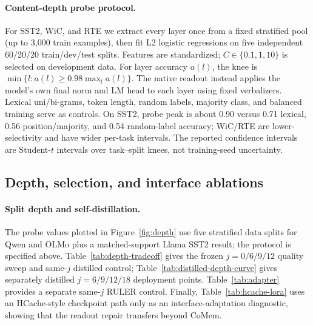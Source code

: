 \paragraph{Content-depth probe protocol.}
For SST2, WiC, and RTE we extract every layer once from a fixed stratified pool
(up to 3,000 train examples), then fit L2 logistic regressions on five independent
60/20/20 train/dev/test splits. Features are standardized; $C\in\{0.1,1,10\}$
is selected on development data. For layer accuracy $a(l)$, the knee is
$\min\{l:a(l)\geq0.98\max_l a(l)\}$. The native readout instead applies the
model's own final norm and LM head to each layer using fixed verbalizers. Lexical
uni/bi-grams, token length, random labels, majority class, and balanced training
serve as controls. On SST2, probe peak is about 0.90 versus 0.71 lexical, 0.56
position/majority, and 0.54 random-label accuracy; WiC/RTE are lower-selectivity
and have wider per-task intervals. The reported confidence intervals are
Student-$t$ intervals over task--split knees, not training-seed uncertainty.

\subsection{Depth, selection, and interface ablations}
\label{app:ablations}

\paragraph{Split depth and self-distillation.}
The probe values plotted in Figure~\ref{fig:depth} use five stratified data
splits for Qwen and OLMo plus a matched-support Llama SST2 result; the protocol
is specified above. Table~\ref{tab:depth-tradeoff} gives the frozen
$j=0/6/9/12$ quality sweep and same-$j$ distilled control;
Table~\ref{tab:distilled-depth-curve} gives separately distilled
$j=6/9/12/18$ deployment points. Table~\ref{tab:adapter} provides a separate
same-$j$ RULER control.
Finally, Table~\ref{tab:hcache-lora} uses an HCache-style checkpoint path only
as an interface-adaptation diagnostic, showing that the readout repair transfers
beyond CoMem.





